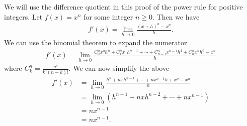 \documentclass[12pt]{article}
\newcommand{\<}{\langle}
\renewcommand{\>}{\rangle}
\begin{document}
We will use the difference quotient in this proof of the power rule for positive integers. Let $f(x)=x^n$ for some integer $n\geq 0$. Then we have
\begin{align*}
f'(x) = \lim_{h\rightarrow 0} \frac{(x+h)^n - x^n}{h}.
\end{align*}
We can use the binomial theorem to expand the numerator
\begin{align*}
f'(x) = \lim_{h\rightarrow 0} \frac{C_0^n x^0h^n + C_1^n x^1h^{n-1} + \cdots + C_{n-1}^n x^{n-1}h^1 + C_n^n x^nh^0 - x^n}{h}
\end{align*}
where $C_k^n=\frac{n!}{k!(n-k)!}$. We can now simplify the above
\begin{align*}
f'(x)&= \lim_{h\rightarrow 0} \frac{h^n + nxh^{n-1} + \cdots + nx^{n-1}h + x^n - x^n}{h}\\
&=\lim_{h\rightarrow 0} (h^{n-1} + nxh^{n-2} + \cdots + nx^{n-1})\\
&=nx^{n-1}\\
&= nx^{n-1}.
\end{align*}
\end{document}
